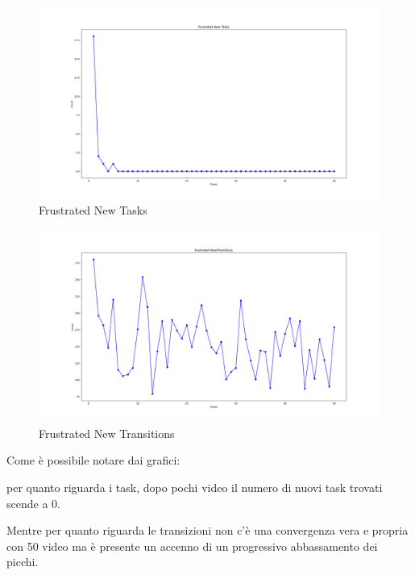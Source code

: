 \begin{figure}
    \centering   
    \includegraphics[width=1\linewidth]{images/frustrated New Tasks.png}
    \caption{Frustrated New Tasks}
    \label{fig:image25}
\end{figure}
\begin{figure}
    \centering   
    \includegraphics[width=1\linewidth]{images/frustrated NewTransitions.png}
    \caption{Frustrated New Transitions}
    \label{fig:image26}
\end{figure}\clearpage

Come è possibile notare dai grafici:

per quanto riguarda i task, dopo pochi video il numero di nuovi task trovati scende a 0.

Mentre per quanto riguarda le transizioni non c’è una convergenza vera e propria con 50 video ma è presente un accenno di un progressivo abbassamento dei picchi.

